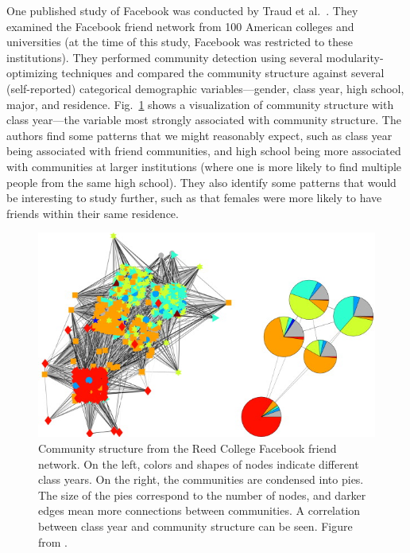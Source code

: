 One published study of Facebook was conducted by Traud et
al.~\autocite{traud_social_2012}. They examined the Facebook friend
network from 100 American colleges and universities (at the time of this
study, Facebook was restricted to these institutions). They performed
community detection using several modularity-optimizing techniques and
compared the community structure against several (self-reported)
categorical demographic variables---gender, class year, high school,
major, and residence. Fig.~\ref{fig:facebook} shows a visualization of
community structure with class year---the variable most strongly
associated with community structure. The authors find some patterns that
we might reasonably expect, such as class year being associated with
friend communities, and high school being more associated with
communities at larger institutions (where one is more likely to find
multiple people from the same high school). They also identify some
patterns that would be interesting to study further, such as that
females were more likely to have friends within their same residence.

\begin{figure}
\centering
\includegraphics{img/traud2012_fig2_facebook.jpg}
\caption{Community structure from the Reed College Facebook friend
network. On the left, colors and shapes of nodes indicate different
class years. On the right, the communities are condensed into pies. The
size of the pies correspond to the number of nodes, and darker edges
mean more connections between communities. A correlation between class
year and community structure can be seen. Figure from
\autocite{traud_social_2012}.}\label{fig:facebook}
\end{figure}

